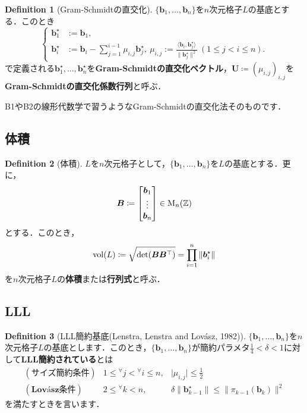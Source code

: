 \documentclass[a4j, dvipdfmx]{jsarticle}
\theoremstyle{definition}
\newtheorem{definition}{Definition}[section]
\begin{document}
\begin{definition}[Gram-Schmidtの直交化]
$\{\boldsymbol{b}_1,\ldots,\boldsymbol{b}_n\}$を$n$次元格子$L$の基底とする．このとき
\[
\left\{\begin{aligned}\boldsymbol{b}_1^\star &:= \boldsymbol{b}_1, \\\boldsymbol{b}_i^\star &:= \boldsymbol{b}_i - \sum_{j=1}^{i-1} \mu_{i, j} \boldsymbol{b}_j^\star,~\mu_{i, j}:=\frac{\langle \boldsymbol{b}_i, \boldsymbol{b}_j^\star\rangle}{\| \boldsymbol{b}_j^\star \|^2}~(1 \leq j < i \leq n).\end{aligned}\right.
\]
で定義される$\boldsymbol{b}_1^\star,\ldots,\boldsymbol{b}_n^\star$を\textbf{Gram-Schmidtの直交化ベクトル}，$\boldsymbol{U}\coloneqq (\mu_{i, j})_{i, j}$を\textbf{Gram-Schmidtの直交化係数行列}と呼ぶ．
\end{definition}

B1やB2の線形代数学で習うようなGram-Schmidtの直交化法そのものです．

\subsection{体積}

\begin{definition}[体積]
$L$を$n$次元格子として，$\{\boldsymbol{b}_1,\ldots,\boldsymbol{b}_n\}$を$L$の基底とする．更に，
\[
\boldsymbol{B}\coloneqq \mqty[\boldsymbol{b}_1\\\vdots\\\boldsymbol{b}_n]\in \mathrm{M}_n(\mathbb{Z})
\]
とする．このとき，
$$
\mathrm{vol}(L)\coloneqq \sqrt{\det(\boldsymbol{BB}^\top)}=\prod_{i=1}^n \norm{\boldsymbol{b}_i^\star}
$$
を$n$次元格子$L$の\textbf{体積}または\textbf{行列式}と呼ぶ．
\end{definition}

\subsection{LLL}

\begin{definition}[LLL簡約基底(Lenstra, Lenstra and Lovász, 1982)]
$\lbrace\boldsymbol{b}_1,\ldots,\boldsymbol{b}_n\rbrace$を$n$次元格子$L$の基底とします．このとき，$\lbrace\boldsymbol{b}_1,\ldots,\boldsymbol{b}_n\rbrace$が簡約パラメタ$\frac{1}{4}<\delta<1$に対して\textbf{LLL簡約されている}とは
$$
\begin{array}{lll}
(\textbf{サイズ簡約条件})&1\le{}^\forall j<{}^\forall i\le n,&\lvert\mu_{i, j}\rvert\le \frac{1}{2}\\
(\textbf{Lovász条件})&2\le{}^\forall k<n, &\delta\lVert \boldsymbol{b}_{k-1}^\star\rVert\le \lVert \pi_{k-1}(\boldsymbol{b}_k)\rVert^2\end{array}$$を満たすときを言います．
\end{definition}
\end{document}
